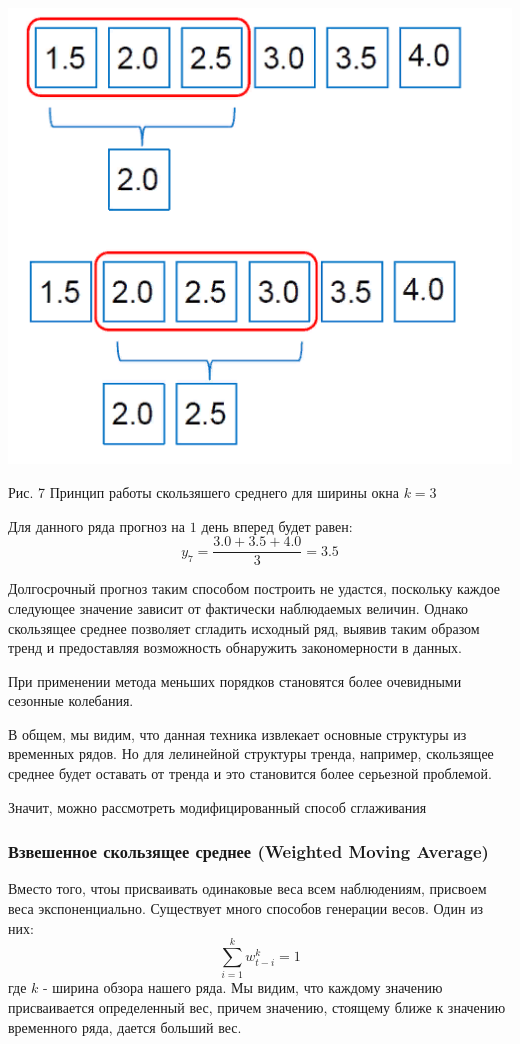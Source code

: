 \documentclass[aps,%
12pt,%
final,%
oneside,
onecolumn,%
musixtex, %
superscriptaddress,%
centertags]{article} %
\theoremstyle{plain}
\theoremstyle{definition}
\theoremstyle{remark}
\begin{document}
\begin{center}
	\includegraphics[scale=0.37]{images/7.png}

	Рис. 7 Принцип работы скользяшего среднего для ширины окна $k=3$
\end{center}

Для данного ряда прогноз на $1$ день вперед будет равен:
$$y_7 = \frac{3.0+3.5+4.0}{3} = 3.5$$

Долгосрочный прогноз таким способом построить не удастся, поскольку каждое следующее значение зависит от фактически наблюдаемых величин. Однако скользящее среднее позволяет сгладить исходный ряд, выявив таким образом тренд и предоставляя возможность обнаружить закономерности в данных.

При применении метода меньших порядков становятся более очевидными сезонные колебания. 

В общем, мы видим, что данная техника извлекает основные структуры из временных рядов. Но для лелинейной структуры тренда, например, скользящее среднее будет оставать от тренда и это становится более серьезной проблемой.

Значит, можно рассмотреть модифицированный способ сглаживания
\subsubsection{Взвешенное скользящее среднее (Weighted Moving Average)}

Вместо того, чтоы присваивать одинаковые веса всем наблюдениям, присвоем веса экспоненциально. Существует много способов генерации весов. Один из них:
$$\sum\limits_{i=1}^k w_{t-i}^k = 1$$
где $k$ - ширина обзора нашего ряда. Мы видим, что каждому значению присваивается определенный вес, причем значению, стоящему ближе к значению временного ряда, дается больший вес.
\end{document}
